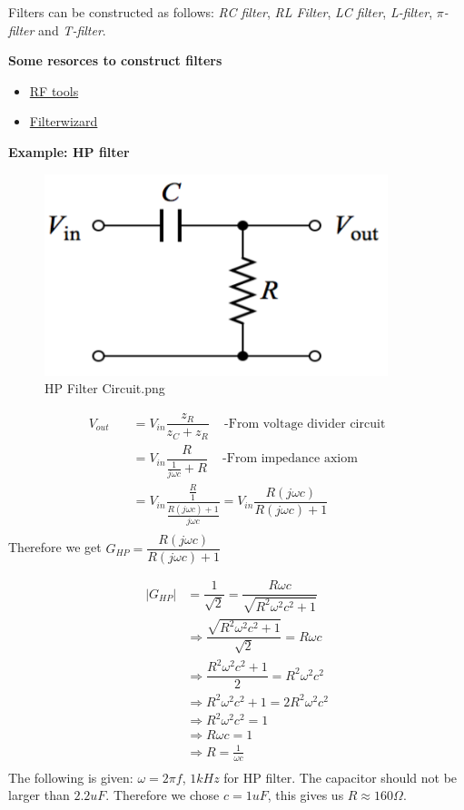 \documentclass{article}
\begin{document}
Filters can be constructed as follows: \newline
\textit{RC filter}, \textit{RL Filter}, \textit{LC filter}, 
\textit{L-filter}, \textit{$\pi$-filter} and \textit{T-filter}.

\newpage
\textbf{Some resorces to construct filters}
\begin{itemize}
    \item \href{https://rf-tools.com/lc-filter/}{RF tools}
    \item \href{https://tools.analog.com/en/filterwizard/}{Filterwizard}
\end{itemize}

\textbf{Example: HP filter}
\begin{figure}[h]
    \centering
    \includegraphics[width=10cm]{image/HP-filter_circuit.png}
    \caption{HP Filter Circuit.png}
\end{figure}
\begin{align*}
    V_{out} &\quad = V_{in}\dfrac{z_R}{z_C+z_R} \;\;\; 
           \text{ -From voltage divider circuit} \\
           &\quad = V_{in}\dfrac{R}{\frac{1}{j\omega c}+R} \;\;\; \text{ -From impedance axiom} \\
           &\quad = V_{in}\dfrac{\frac{R}{1}}{\frac{R(j\omega c)+1}{j\omega c}} 
           = V_{in}\dfrac{R(j\omega c)}{R(j\omega c)+1}  \\
\end{align*}
Therefore we get $G_{HP}=\dfrac{R(j\omega c)}{R(j\omega c)+1}$

\begin{align*}
|G_{HP}| &=\dfrac{1}{\sqrt{2}}=\dfrac{R\omega c}{\sqrt{R^2\omega^2c^2+1}} \\
         &\Rightarrow \dfrac{\sqrt{R^2\omega^2c^2+1}}{\sqrt{2}}=R\omega c \\
         &\Rightarrow \dfrac{R^2\omega^2c^2+1}{2}=R^2\omega^2c^2 \\
         &\Rightarrow R^2\omega^2c^2+1=2R^2\omega^2c^2 \\
         &\Rightarrow R^2\omega^2c^2=1 \\
         &\Rightarrow R\omega c=1 \\
         &\Rightarrow R=\frac{1}{\omega c} \\
\end{align*}
The following is given: $\omega=2\pi f$, $1kHz$ for HP filter.
The capacitor should not be larger than $2.2uF$.
Therefore we chose $c=1uF$, this gives us $R\approx 160\Omega$.
\end{document}
